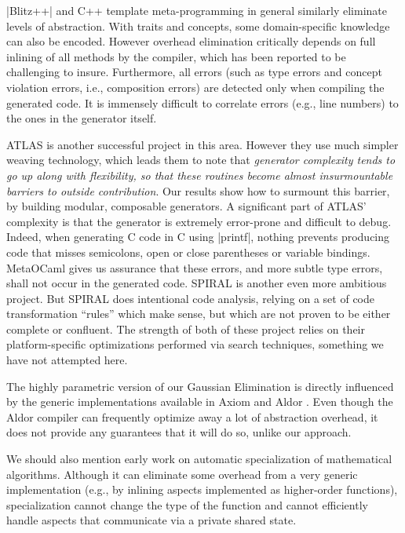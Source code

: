 \documentclass{elsart}
\begin{document}
|Blitz++| \cite{Veldhuizen:1998:ISCOPE} and {C++} template
meta-programming in general similarly eliminate levels
of abstraction.  With traits and concepts, some domain-specific
knowledge can also be encoded.  However overhead elimination
critically depends on full inlining of all methods by the compiler,
which has been reported to be challenging to insure. Furthermore, all
errors (such as type errors and concept violation errors, i.e.,
composition errors) are detected only when compiling the generated
code. It is immensely difficult to correlate errors (e.g., line
numbers) to the ones in the generator itself.

ATLAS \cite{ATLAS} is another successful project in this area.
However they use much simpler weaving technology, which leads them to
note that \emph{generator complexity tends to go up along with
  flexibility, so that these routines become almost insurmountable
  barriers to outside contribution}. Our results show how to surmount
this barrier, by building modular, composable generators. A
significant part of ATLAS' complexity is that the generator is
extremely error-prone and difficult to debug.  Indeed, when generating
C code in C using |printf|, nothing prevents producing code that
misses semicolons, open or close parentheses or variable
bindings. MetaOCaml gives us assurance that these errors, and more
subtle type errors, shall not occur in the generated code.  SPIRAL
\cite{Pueschel:05} is another even more ambitious project.  But
SPIRAL does intentional code analysis, relying on a set of code
transformation ``rules'' which make sense, but which are not proven to
be either complete or confluent.  The strength of both of these
project relies on their platform-specific optimizations performed via
search techniques, something we have not attempted here.

The highly parametric version of our Gaussian Elimination is directly
influenced by the generic implementations available in Axiom
\cite{Axiom} and Aldor \cite{Watt:2002:HCA}.  Even though the Aldor
compiler can frequently optimize away a lot of abstraction overhead, 
it does not provide any guarantees that it will do so, unlike our
approach.

We should also mention early work \cite{Gluck95} on automatic
specialization of mathematical algorithms. Although it can eliminate
some overhead from a very generic implementation (e.g., by inlining
aspects implemented as higher-order functions), specialization cannot
change the type of the function and cannot efficiently handle aspects
that communicate via a private shared state.
\end{document}
